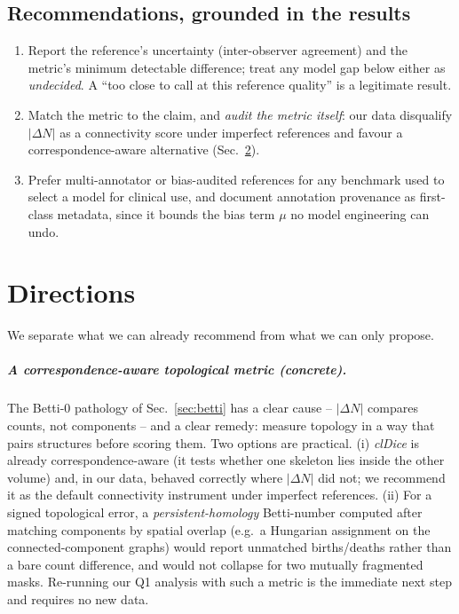 \documentclass[
    bookmarks, bookmarksnumbered, bookmarksopen,
    colorlinks=true, citecolor=blue, linkcolor=blue, urlcolor=blue
]{techrep}
\begin{document}
\section{Recommendations, grounded in the results}
\begin{enumerate}[leftmargin=1.4em,itemsep=2pt]
  \item Report the reference's uncertainty (inter-observer agreement) and the metric's minimum
  detectable difference; treat any model gap below either as \emph{undecided}. A ``too close to
  call at this reference quality'' is a legitimate result.
  \item Match the metric to the claim, and \emph{audit the metric itself}: our data disqualify
  $|\Delta N|$ as a connectivity score under imperfect references and favour a
  correspondence-aware alternative (Sec.~\ref{sec:future}).
  \item Prefer multi-annotator or bias-audited references for any benchmark used to select a model
  for clinical use, and document annotation provenance as first-class metadata, since it bounds
  the bias term $\mu$ no model engineering can undo.
\end{enumerate}

\chapter{Directions}\label{sec:future}
We separate what we can already recommend from what we can only propose.

\paragraph{A correspondence-aware topological metric (concrete).} The Betti-$0$ pathology of
Sec.~\ref{sec:betti} has a clear cause -- $|\Delta N|$ compares counts, not components -- and a
clear remedy: measure topology in a way that pairs structures before scoring them. Two options
are practical. (i) \emph{clDice} is already correspondence-aware (it tests whether one skeleton
lies inside the other volume) and, in our data, behaved correctly where $|\Delta N|$ did not; we
recommend it as the default connectivity instrument under imperfect references. (ii) For a
signed topological error, a \emph{persistent-homology} Betti-number computed after matching
components by spatial overlap (e.g.\ a Hungarian assignment on the connected-component graphs)
would report unmatched births/deaths rather than a bare count difference, and would not collapse
for two mutually fragmented masks. Re-running our Q1 analysis with such a metric is the immediate
next step and requires no new data.
\end{document}
